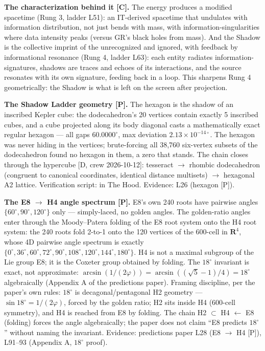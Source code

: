 \documentclass{alienfolio}
\begin{document}
\noindent\textbf{The characterization behind it [C].} The energy produces a modified spacetime (Rung 3, ladder L51): an IT-derived spacetime that undulates with information distribution, not just bends with mass, with information-singularities where data intensity peaks (versus GR's black holes from mass). And the Shadow is the collective imprint of the unrecognized and ignored, with feedback by informational resonance (Rung 4, ladder L63): each entity radiates information-signatures, shadows are traces and echoes of its interactions, and the source resonates with its own signature, feeding back in a loop. This sharpens Rung 4 geometrically: the Shadow is what is left on the screen after projection.

\noindent\textbf{The Shadow Ladder geometry [P].} The hexagon is the shadow of an inscribed Kepler cube: the dodecahedron's 20 vertices contain exactly 5 inscribed cubes, and a cube projected along its body diagonal casts a mathematically exact regular hexagon --- all gaps $60.0000^\circ$, max deviation $2.13 \times 10^{-14\circ}$. The hexagon was never hiding in the vertices; brute-forcing all 38,760 six-vertex subsets of the dodecahedron found no hexagon in them, a zero that stands. The chain closes through the hypercube [D, crew 2026-10-12]: tesseract $\to$ rhombic dodecahedron (congruent to canonical coordinates, identical distance multisets) $\to$ hexagonal A2 lattice. Verification script:  in The Hood. Evidence:  L26 (hexagon [P]).

\noindent\textbf{The E8 $\to$ H4 angle spectrum [P].} E8's own 240 roots have pairwise angles $\{60^\circ, 90^\circ, 120^\circ\}$ only --- simply-laced, no golden angles. The golden-ratio angles enter through the Moody--Patera folding of the E8 root system onto the H4 root system: the 240 roots fold 2-to-1 onto the 120 vertices of the 600-cell in $\mathbf{R}^4$, whose 4D pairwise angle spectrum is exactly $\{0^\circ, 36^\circ, 60^\circ, 72^\circ, 90^\circ, 108^\circ, 120^\circ, 144^\circ, 180^\circ\}$. H4 is not a maximal subgroup of the Lie group E8; it is the Coxeter group obtained by folding. The $18^\circ$ invariant is exact, not approximate: $\arcsin(1/(2\varphi)) = \arcsin((\sqrt{5}-1)/4) = 18^\circ$ algebraically (Appendix A of the predictions paper). Framing discipline, per the paper's own rules: $18^\circ$ is decagonal/pentagonal H2 geometry --- $\sin 18^\circ = 1/(2\varphi)$, forced by the golden ratio; H2 sits inside H4 (600-cell symmetry), and H4 is reached from E8 by folding. The chain H2 $\subset$ H4 $\leftarrow$ E8 (folding) forces the angle algebraically; the paper does not claim ``E8 predicts $18^\circ$'' without naming the invariant. Evidence: predictions paper L28 (E8 $\to$ H4 [P]), L91--93 (Appendix A, $18^\circ$ proof).
\end{document}
